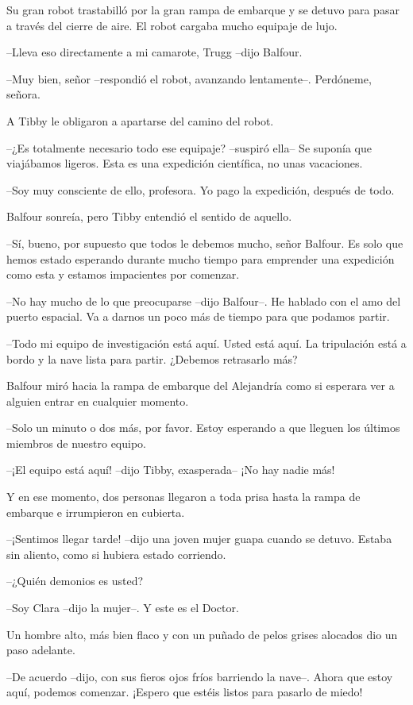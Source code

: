 {Su gran robot trastabilló por la gran rampa de embarque y se detuvo para
 pasar a través del cierre de aire. El robot cargaba mucho equipaje de
lujo.}

{--Lleva eso directamente a mi camarote, Trugg --dijo Balfour.}

{--Muy bien, señor --respondió el robot, avanzando lentamente--.
Perdóneme, señora.}

{A Tibby le obligaron a apartarse del camino del robot.}

{--¿Es totalmente necesario todo ese equipaje? --suspiró ella-- Se
 suponía que viajábamos ligeros. Esta es una expedición científica, no
unas vacaciones.}

{--Soy muy consciente de ello, profesora. Yo pago la expedición, después
de todo.}

{Balfour sonreía, pero Tibby entendió el sentido de aquello.}

{--Sí, bueno, por supuesto que todos le debemos mucho, señor Balfour. Es
 solo que hemos estado esperando durante mucho tiempo para emprender una
expedición como esta y estamos impacientes por comenzar.}

{--No hay mucho de lo que preocuparse --dijo Balfour--. He hablado con el
 amo del puerto espacial. Va a darnos un poco más de tiempo para que
podamos partir.}

{--Todo mi equipo de investigación está aquí. Usted está aquí. La
 tripulación está a bordo y la nave lista para partir. ¿Debemos
retrasarlo más?}

{Balfour miró hacia la rampa de embarque del Alejandría como si esperara
ver a alguien entrar en cualquier momento.}

{--Solo un minuto o dos más, por favor. Estoy esperando a que lleguen los
últimos miembros de nuestro equipo.}

{--¡El equipo está aquí! --dijo Tibby, exasperada-- ¡No hay nadie más!}

{Y en ese momento, dos personas llegaron a toda prisa hasta la rampa de
embarque e irrumpieron en cubierta.}

{--¡Sentimos llegar tarde! --dijo una joven mujer guapa cuando se detuvo.
Estaba sin aliento, como si hubiera estado corriendo.}

{--¿Quién demonios es usted?}

{--Soy Clara --dijo la mujer--. Y este es el Doctor.}

{Un hombre alto, más bien flaco y con un puñado de pelos grises alocados
dio un paso adelante.}

{--De acuerdo --dijo, con sus fieros ojos fríos barriendo la nave--.
 Ahora que estoy aquí, podemos comenzar. ¡Espero que estéis listos para
pasarlo de miedo!}
